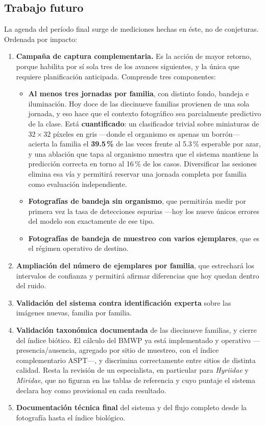 \documentclass[onecolumn]{article}
\begin{document}
\subsection{Trabajo futuro}

La agenda del período final surge de mediciones hechas en éste, no de conjeturas. Ordenada por impacto:

\begin{enumerate}
  \item \textbf{Campaña de captura complementaria.} Es la acción de mayor retorno, porque habilita por sí sola tres de los avances siguientes, y la única que requiere planificación anticipada. Comprende tres componentes:
  \begin{itemize}
    \item \textbf{Al menos tres jornadas por familia}, con distinto fondo, bandeja e iluminación. Hoy doce de las diecinueve familias provienen de una sola jornada, y eso hace que el contexto fotográfico sea parcialmente predictivo de la clase. Está \textbf{cuantificado}: un clasificador trivial sobre miniaturas de $32\times32$ píxeles en gris ---donde el organismo es apenas un borrón--- acierta la familia el \textbf{39.5\,\%} de las veces frente al 5.3\,\% esperable por azar, y una ablación que tapa al organismo muestra que el sistema mantiene la predicción correcta en torno al 16\,\% de los casos. Diversificar las sesiones elimina esa vía y permitirá reservar una jornada completa por familia como evaluación independiente.
    \item \textbf{Fotografías de bandeja sin organismo}, que permitirán medir por primera vez la tasa de detecciones espurias ---hoy los nueve únicos errores del modelo son exactamente de ese tipo.
    \item \textbf{Fotografías de bandeja de muestreo con varios ejemplares}, que es el régimen operativo de destino.
  \end{itemize}
  \item \textbf{Ampliación del número de ejemplares por familia}, que estrechará los intervalos de confianza y permitirá afirmar diferencias que hoy quedan dentro del ruido.
  \item \textbf{Validación del sistema contra identificación experta} sobre las imágenes nuevas, familia por familia.
  \item \textbf{Validación taxonómica documentada} de las diecinueve familias, y cierre del índice biótico. El cálculo del BMWP ya está implementado y operativo ---presencia/ausencia, agregado por sitio de muestreo, con el índice complementario ASPT---, y discrimina correctamente entre sitios de distinta calidad. Resta la revisión de un especialista, en particular para \emph{Hyriidae} y \emph{Miridae}, que no figuran en las tablas de referencia y cuyo puntaje el sistema declara hoy como provisional en cada resultado.
  \item \textbf{Documentación técnica final} del sistema y del flujo completo desde la fotografía hasta el índice biológico.
\end{enumerate}
\end{document}
